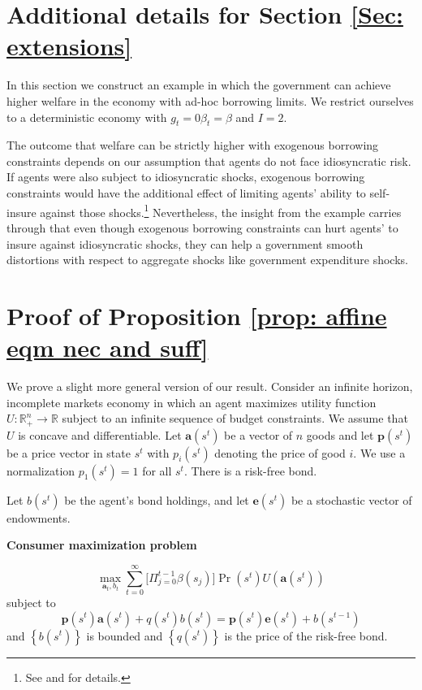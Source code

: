 \documentclass[thmsb,11pt]{article}
\begin{document}
\begin{appendix}

\section{Additional details for Section \ref{Sec: extensions}}
\label{appndx: borrowing constraints example}
In this section we construct an example in which the government can achieve
higher welfare in the economy with ad-hoc borrowing limits. We restrict ourselves to a deterministic economy with $g_t=0 \beta_t=\beta$ and $I=2$. 


The outcome that welfare can be strictly higher with exogenous borrowing
constraints depends on our assumption that agents do not face idiosyncratic risk. If agents were also subject to idiosyncratic shocks,
exogenous borrowing constraints would have the additional effect of limiting
agents' ability to self-insure against those shocks.\footnote{%
See \cite{Aiyagari1998} and \cite{Heathcote2005} for details.}
Nevertheless, the insight from the example carries through that even though exogenous
borrowing constraints can hurt agents' to insure against idiosyncratic shocks, they
can help a government smooth distortions with respect to aggregate shocks
like government expenditure shocks.



\smallskip
\section{\smallskip Proof of Proposition  \ref{prop: affine eqm nec and suff}}
\label{appndx: affine eqm nec and stuff}
\smallskip

We prove a slight more general version of our result. Consider an infinite
horizon, incomplete markets economy in which an agent maximizes utility
function $U:\mathbb{R}_{+}^{n}\rightarrow \mathbb{R}$ subject to an infinite
sequence of budget constraints. We assume that $U$ is concave and
differentiable. Let $\bm{a}(s^t)$ be a vector of $n$ goods and let $%
\bm{p}(s^{t})$ be a price vector in state $s^{t}$ with $p_{i}(s^{t})$
denoting the price of good $i.$ We use a normalization $p_{1}\left(
s^{t}\right) =1$ for all $s^{t}.$ There is a risk-free bond.

Let $b(s^{t})$ be the agent's bond holdings, and let $\bm{e}\left(
s^{t}\right) $ be a stochastic vector of endowments.

\textbf{Consumer maximization problem}


\begin{equation}
\max_{\bm{a}_{t},b_{t}}\sum_{t=0}^{\infty }\bigl[\Pi_{j=0}^{t-1} \beta(s_j)\bigr]\Pr \left(
s^{t}\right) U(\bm{a}\left( s^{t}\right) )
\label{Tech appendix: consumer maximization}
\end{equation}%
subject to%
\begin{equation}
\bm{p}\left( s^{t}\right) \bm{a}\left( s^{t}\right) +q(s^{t})b\left(
s^{t}\right) =\bm{p}\left( s^{t}\right) \bm{e}\left( s^{t}\right)
+b\left( s^{t-1}\right)  \label{Tech appendix: budget constraint}
\end{equation}%
and $\left \{ b\left( s^{t}\right) \right \} $ is bounded and $\left \{
q(s^{t})\right \} $ is the price of the risk-free bond.


\end{appendix}
\end{document}

